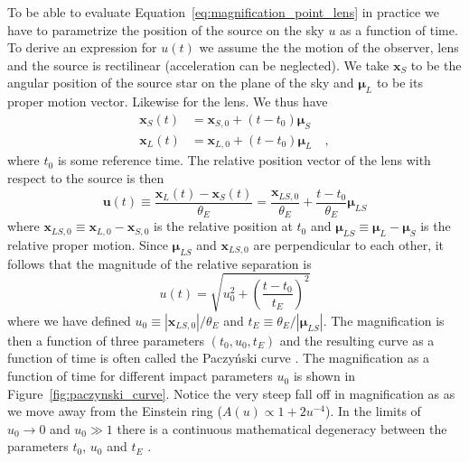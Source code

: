 \documentclass[12pt]{report}
\renewcommand{\vec}[1]{\boldsymbol{\mathbf{#1}}}
\begin{document}
To be able to evaluate Equation~\ref{eq:magnification_point_lens} in practice
we have to parametrize the position of the source on the sky $u$ as a function
of time. To derive an expression for $u(t)$ we assume the the motion of the
observer, lens and the source is rectilinear (acceleration can be neglected).
We take $\vec{x}_S$ to be the angular position of the source star on the plane
of the sky and $\boldsymbol{\mu}_L$ to be its proper motion vector. Likewise
for the lens. We thus have
\begin{align}
    \vec{x}_S(t) & =\vec{x}_{S, 0}+
    \left(t-t_{0}\right) \boldsymbol{\mu}_S
    \label{eq:source_position}      \\
    \vec{x}_L(t) & =\vec{x}_{L, 0}
    +\left(t-t_{0}\right) \boldsymbol{\mu}_L\quad,
    \label{eq:lens_position}
\end{align}
where $t_0$ is some reference time.
The relative position vector of the lens with respect to the source is then
\begin{equation}
    \boldsymbol{u}(t) \equiv \frac{\vec{x}_L(t)
        -\vec{x}_S(t)}{\theta_E}=
    \frac{\vec{x}_{LS, 0}}{\theta_E}
    +\frac{t-t_{0}}{\theta_E} \boldsymbol{\mu}_{LS}
    \label{eq:relative_trajectory_no_parallax}
\end{equation}
where
$\vec{x}_{L S, 0}\equiv\vec{x}_{L,0}-\vec{x}_{S, 0}$
is the relative position at $t_0$ and
$\boldsymbol{\mu}_{LS}\equiv \boldsymbol{\mu}_{L}- \boldsymbol{\mu}_{S}$ is the
relative proper motion.
Since $\boldsymbol{\mu}_{LS}$ and $\vec{x}_{L S, 0}$ are
perpendicular to each other, it follows that the magnitude of the relative
separation is
\begin{equation}
    u(t)=\sqrt{u_0^2+ \left(\frac{t-t_0}{t_E}\right)^2}
\end{equation}
where we have defined $u_0\equiv |\vec{x}_{L S, 0}|/\theta_E$
and $t_E\equiv \theta_E/|\boldsymbol{\mu}_{LS}|$.
The magnification is then a function of three parameters $(t_0, u_0, t_E)$
and the resulting curve as a function of time is often called the Paczy\'nski curve
\citep{1986ApJ...304....1P,1986ApJ...301..503P}.
The magnification as a function of time for different impact parameters $u_0$
is shown in Figure~\ref{fig:paczynski_curve}. Notice the very steep fall off in
magnification as as we move away from the Einstein ring ($A(u)\propto
    1+2u^{-4}$).
In the limits of $u_0\rightarrow 0$ and $u_0\gg 1$  there is a continuous
mathematical degeneracy between the parameters $t_0$, $u_0$ and $t_E$
\citep{1997ApJ...487...55W}.
\end{document}
